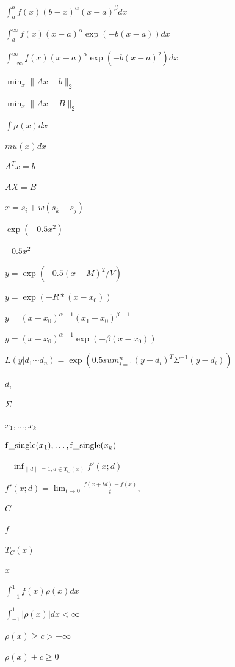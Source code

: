 \documentclass{article}
\begin{document}
$ \int_{a}^{b} f(x) (b - x)^\alpha (x - a)^\beta dx $
\pagebreak

$ \int_{a}^{\infty} f(x) (x - a)^\alpha \exp \left(-b (x - a) \right) dx $
\pagebreak

$ \int_{-\infty}^{\infty} f(x) (x - a)^\alpha \exp \left(-b (x - a)^2 \right) dx $
\pagebreak

$ \min_x \| A x - b \|_2 $
\pagebreak

$ \min_x \| A x - B \|_2 $
\pagebreak

$ \int \mu(x) dx$
\pagebreak

$ mu(x) dx$
\pagebreak

$ A^T x = b $
\pagebreak

$ A X = B $
\pagebreak

$ x = s_i + w ( s_k - s_j) $
\pagebreak

$ \exp( -0.5 x^2 ) $
\pagebreak

$ -0.5 x^2 $
\pagebreak

$ y = \exp(- 0.5 (x - M)^2 / V) $
\pagebreak

$ y = \exp(- R * (x - x_0)) $
\pagebreak

$ y = (x - x_0)^{\alpha - 1} (x_1 - x_0)^{\beta - 1} $
\pagebreak

$ y = (x - x_0)^{\alpha - 1} \exp(-\beta (x - x_0)) $
\pagebreak

$ L(y | d_1 \cdots d_n) = \exp\left( 0.5 sum_{i=1}^n (y - d_i)^T \Sigma^{-1} (y - d_i) \right)$
\pagebreak

$ d_i $
\pagebreak

$ \Sigma $
\pagebreak

$ x_1,\ldots,x_k $
\pagebreak

$ {\rm f\_single}(x_1),\ldots, {\rm f\_single}(x_k) $
\pagebreak

$ -\inf_{\|d\| = 1, d\in T_C(x)} f'(x;d) $
\pagebreak

$ f'(x;d)=\lim_{t \to 0} \frac{ f(x+td)-f(x) }{ t }, $
\pagebreak

$C$
\pagebreak

$f$
\pagebreak

$T_C(x)$
\pagebreak

$x$
\pagebreak

$ \int_{-1}^{1} f(x) \rho(x) dx $
\pagebreak

$ \int_{-1}^{1} | \rho(x) | dx < \infty $
\pagebreak

$ \rho(x) \geq c > -\infty $
\pagebreak

$ \rho(x) + c \geq 0 $
\pagebreak
\end{document}
